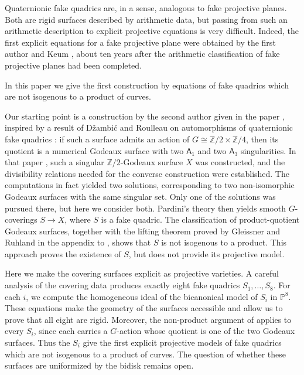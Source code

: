 \documentclass[11pt,a4paper]{article}
\newcommand{\PP}{\mathbb P}
\newcommand{\ZZ}{\mathbb Z}
\begin{document}
Quaternionic fake quadrics are, in a sense, analogous to fake projective
planes. Both are rigid surfaces described by arithmetic data, but passing
from such an arithmetic description to explicit projective equations is very
difficult. Indeed, the first explicit equations for a fake projective plane
were obtained by the first author and Keum \cite{BorisovKeum20}, about ten
years after the arithmetic classification of fake projective planes had been
completed.

In this paper we give the first construction by equations of fake quadrics which are
not isogenous to a product of curves.

Our starting point is a construction by the second author given in the paper
\cite{RitoExplicitFQ}, inspired by a result of D\v{z}ambi\'c and Roulleau on
automorphisms of quaternionic fake quadrics \cite{DzambicRoulleau14}: if such
a surface admits an action of $G\cong\ZZ/2\times\ZZ/4$, then its quotient is a
numerical Godeaux surface with two $\mathsf A_1$ and two $\mathsf A_3$ singularities.
In that paper \cite{RitoExplicitFQ}, such a singular
$\ZZ/2$-Godeaux surface $X$ was constructed, and the
divisibility relations needed for the converse construction were established.
The computations in fact yielded two solutions,
corresponding to two non-isomorphic Godeaux surfaces with the same singular
set. Only one of the solutions was pursued there, but here we consider both.
Pardini's theory then yields smooth $G$-coverings $S\to X$, where $S$ is
a fake quadric.  The classification of product-quotient Godeaux surfaces,
together with the lifting theorem proved by Gleissner and Ruhland in the
appendix to \cite{RitoExplicitFQ}, shows that $S$ is not isogenous to a
product.  This approach proves the existence of $S$, but does not provide
its projective model.

Here we make the covering surfaces explicit as projective varieties.  A careful
analysis of the covering data produces exactly eight fake quadrics
$S_1,\ldots,S_8$.  For each $i$, we compute the homogeneous ideal of the
bicanonical model of $S_i$ in $\PP^8$.  These equations make the geometry of
the surfaces accessible and allow us to prove that all eight are rigid.
Moreover, the non-product argument of \cite{RitoExplicitFQ} applies to every
$S_i$, since each carries a $G$-action whose quotient is one of the two
Godeaux surfaces.  Thus the $S_i$ give the first explicit projective models of
fake quadrics which are not isogenous to a product of curves.
The question of whether these surfaces are uniformized by the bidisk remains open.
\end{document}
